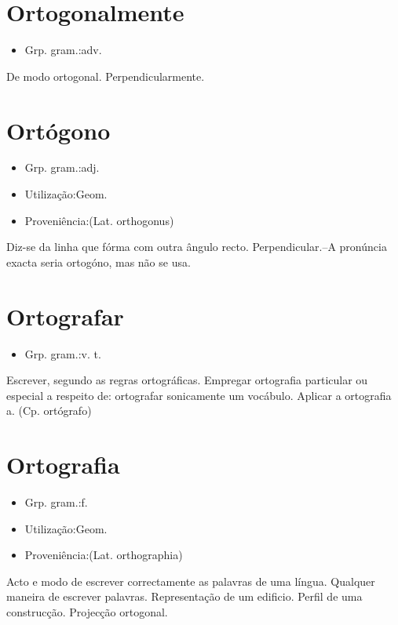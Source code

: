 \section{Ortogonalmente}
\begin{itemize}
\item {Grp. gram.:adv.}
\end{itemize}
De modo ortogonal.
Perpendicularmente.
\section{Ortógono}
\begin{itemize}
\item {Grp. gram.:adj.}
\end{itemize}
\begin{itemize}
\item {Utilização:Geom.}
\end{itemize}
\begin{itemize}
\item {Proveniência:(Lat. \textunderscore orthogonus\textunderscore )}
\end{itemize}
Diz-se da linha que fórma com outra ângulo recto.
Perpendicular.--A pronúncia exacta seria \textunderscore ortogóno\textunderscore , mas não se usa.
\section{Ortografar}
\begin{itemize}
\item {Grp. gram.:v. t.}
\end{itemize}
Escrever, segundo as regras ortográficas.
Empregar ortografia particular ou especial a respeito de: \textunderscore ortografar sonicamente um vocábulo\textunderscore .
Aplicar a ortografia a.
(Cp. \textunderscore ortógrafo\textunderscore )
\section{Ortografia}
\begin{itemize}
\item {Grp. gram.:f.}
\end{itemize}
\begin{itemize}
\item {Utilização:Geom.}
\end{itemize}
\begin{itemize}
\item {Proveniência:(Lat. \textunderscore orthographia\textunderscore )}
\end{itemize}
Acto e modo de escrever correctamente as palavras de uma língua.
Qualquer maneira de escrever palavras.
Representação de um edificio.
Perfil de uma construcção.
Projecção ortogonal.
